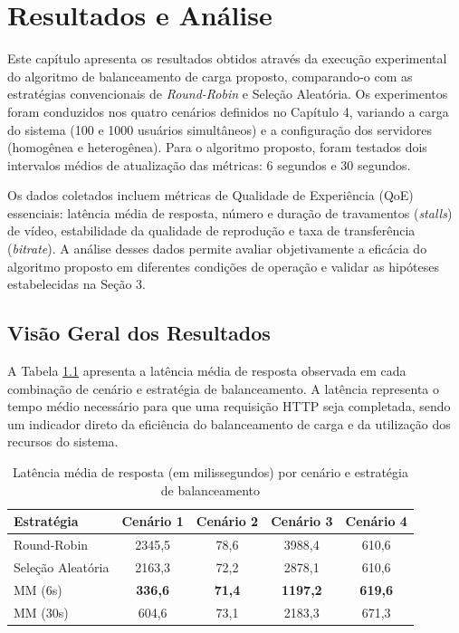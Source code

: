 \chapter{Resultados e Análise}

Este capítulo apresenta os resultados obtidos através da execução experimental do algoritmo de balanceamento de carga proposto, comparando-o com as estratégias convencionais de \textit{Round-Robin} e Seleção Aleatória. Os experimentos foram conduzidos nos quatro cenários definidos no Capítulo 4, variando a carga do sistema (100 e 1000 usuários simultâneos) e a configuração dos servidores (homogênea e heterogênea). Para o algoritmo proposto, foram testados dois intervalos médios de atualização das métricas: 6 segundos e 30 segundos.

Os dados coletados incluem métricas de Qualidade de Experiência (QoE) essenciais: latência média de resposta, número e duração de travamentos (\textit{stalls}) de vídeo, estabilidade da qualidade de reprodução e taxa de transferência (\textit{bitrate}). A análise desses dados permite avaliar objetivamente a eficácia do algoritmo proposto em diferentes condições de operação e validar as hipóteses estabelecidas na Seção 3.

\section{Visão Geral dos Resultados}

A Tabela \ref{tab:latency-results} apresenta a latência média de resposta observada em cada combinação de cenário e estratégia de balanceamento. A latência representa o tempo médio necessário para que uma requisição HTTP seja completada, sendo um indicador direto da eficiência do balanceamento de carga e da utilização dos recursos do sistema.

\begin{table}[htbp]
\centering
\caption{Latência média de resposta (em milissegundos) por cenário e estratégia de balanceamento}
\label{tab:latency-results}
\small
\begin{tabular}{|l|c|c|c|c|}
\hline
\textbf{Estratégia} & \textbf{Cenário 1} & \textbf{Cenário 2} & \textbf{Cenário 3} & \textbf{Cenário 4} \\
\hline
Round-Robin & 2345,5 & 78,6 & 3988,4 & 610,6 \\
\hline
Seleção Aleatória & 2163,3 & 72,2 & 2878,1 & 610,6 \\
\hline
MM (6s) & \textbf{336,6} & \textbf{71,4} & \textbf{1197,2} & \textbf{619,6} \\
\hline
MM (30s) & 604,6 & 73,1 & 2183,3 & 671,3 \\
\hline
\end{tabular}
\end{table}

